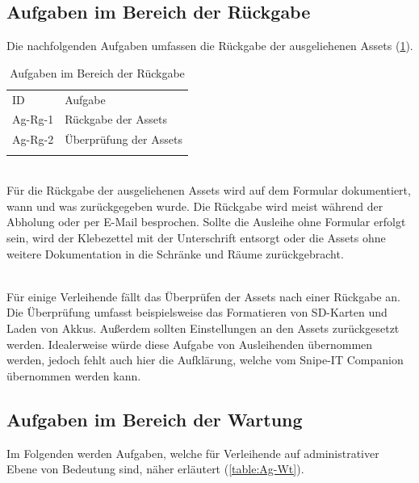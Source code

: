 \subsection{Aufgaben im Bereich der Rückgabe}
Die nachfolgenden Aufgaben umfassen die Rückgabe der ausgeliehenen Assets
(\ref{table:Ag-Rg}).
\begin{table}[h]
        \centering
        \caption{Aufgaben im Bereich der Rückgabe}
        \begin{tabular}{ll}
                \arrayrulecolor{maincolor}\hline
                \sffamily\color{maincolor}ID & \sffamily\color{maincolor}Aufgabe
                \\
                \arrayrulecolor{maincolor}\hline
                Ag-Rg-1                      & Rückgabe der Assets
                \\
                Ag-Rg-2                      & Überprüfung der Assets
                \\
                \arrayrulecolor{maincolor}\hline
        \end{tabular}
        \label{table:Ag-Rg}
\end{table}

{\sffamily\color{maincolor}{Ag-Rg-1 | Rückgabe der Assets}} \\
Für die Rückgabe der ausgeliehenen Assets wird auf dem Formular dokumentiert,
wann und was zurückgegeben wurde. Die Rückgabe wird meist während der Abholung
oder per E-Mail besprochen. Sollte die Ausleihe ohne Formular erfolgt sein, wird
der Klebezettel mit der Unterschrift entsorgt oder die Assets ohne weitere
Dokumentation in die Schränke und Räume zurückgebracht.

{\sffamily\color{maincolor}{Ag-Rg-2 | Überprüfung der Assets}}\\
Für einige Verleihende fällt das Überprüfen der Assets nach einer Rückgabe an.
Die Überprüfung umfasst beispielsweise das Formatieren von SD-Karten und Laden
von Akkus. Außerdem sollten Einstellungen an den Assets zurückgesetzt werden.
Idealerweise würde diese Aufgabe von Ausleihenden übernommen werden, jedoch
fehlt auch hier die Aufklärung, welche vom Snipe-IT Companion übernommen werden
kann.
\subsection{Aufgaben im Bereich der Wartung}
\label{subsec:wartung}
Im Folgenden werden Aufgaben, welche für Verleihende auf administrativer Ebene
von Bedeutung sind, näher erläutert (\ref{table:Ag-Wt}).

